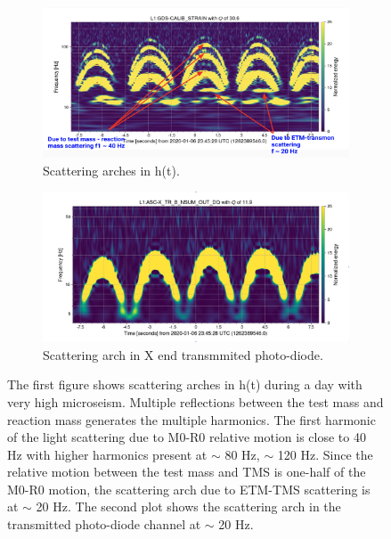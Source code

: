 \documentclass[12pt]{iopart}
\begin{document}
\begin{figure}[h]
   \centering
    \begin{subfigure}[b]{0.45\textwidth}
        \centering
         \includegraphics[width= \textwidth]{1262389546darm.png}
         \caption{Scattering arches in h(t).}
         \label{fig:1262darm}
    \end{subfigure}
    \hfill
    \begin{subfigure}[b]{0.45\textwidth}
        \centering
         \includegraphics[width =\textwidth]{1262389546trans.png}
         \caption{Scattering arch in X end transmmited photo-diode.}
         \label{fig:1262trans}
         
    
    \end{subfigure}
    \caption{The first figure shows scattering arches in h(t) during a day with very high microseism. Multiple reflections between the test mass and reaction mass generates the multiple harmonics. The first harmonic of the light scattering due to M0-R0 relative motion is close to 40 Hz with higher harmonics present at $\sim$ 80 Hz, $\sim$ 120 Hz. Since the relative motion between the test mass and TMS is one-half of the M0-R0 motion, the scattering arch due to ETM-TMS scattering is at $\sim$ 20 Hz. The second plot shows the scattering arch in the transmitted photo-diode channel at $\sim$ 20 Hz.}
    \label{fig:1262scat}
    
\end{figure}
\end{document}
